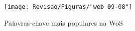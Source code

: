 \begin{figure}[htp!]
	\centering
	\caption{Palavras-chave mais populares na WoS}
	\label{fig:web-09-08}
	\texttt{[image: Revisao/Figuras/"web 09-08"]}
	
	
	
\end{figure}